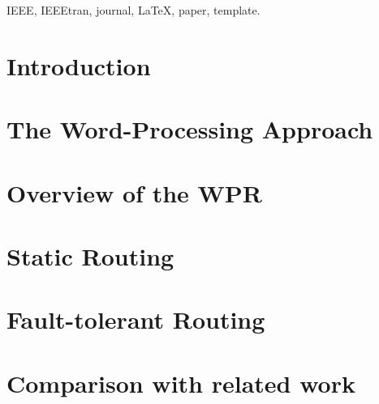 \documentclass[journal]{IEEEtran}
\begin{document}
\begin{IEEEkeywords}
IEEE, IEEEtran, journal, \LaTeX, paper, template.
\end{IEEEkeywords}






%
\IEEEpeerreviewmaketitle

\section{Introduction}


\section{The Word-Processing Approach}


\section{Overview of the WPR}


\section{Static Routing}


\section{Fault-tolerant Routing}


\section{Comparison with related work}


%
\end{document}

